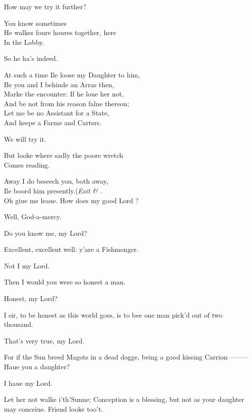 \documentclass[a5paper,DIV=calc,11pt]{scrbook}
\begin{document}
\begin{drama*}
    \kingspeaks How may we try it further?
    
    \polspeaks You know sometimes\\
    He walkes foure houres together, here\\
    In the Lobby.
    
    \queenspeaks So he ha's indeed.
    
    \polspeaks At such a time Ile loose my Daughter to him,\\
    Be you and I behinde an Arras then,\\
    Marke the encounter: If he loue her not,\\
    And be not from his reason falne thereon;\\
    Let me be no Assistant for a State,\\
    And keepe a Farme and Carters.
    
    \kingspeaks We will try it.
    
    
    \queenspeaks But looke where sadly the poore wretch\\
    Comes reading.
    
    \polspeaks Away I do beseech you, both away,\\
    Ile boord him presently.\hfill(\textit{Exit \king \& \queen.}\\
    Oh giue me leaue. How does my good Lord \ham?
    
    \hamspeaks Well, God-a-mercy.
    
    \polspeaks Do you know me, my Lord?
    
    \hamspeaks Excellent, excellent well: y'are a Fishmonger.
    
    \polspeaks Not I my Lord.
    
    \hamspeaks Then I would you were so honest a man.
    
    \polspeaks Honest, my Lord?
    
    \hamspeaks I sir, to be honest as this world goes, is to bee one man pick'd out of two thousand.
    
    \polspeaks That's very true, my Lord.
    
    \hamspeaks For if the Sun breed Magots in a dead dogge, being a good kissing Carrion———\\
    Haue you a daughter?
    
    \polspeaks I haue my Lord.
    
    \hamspeaks Let her not walke i'th'Sunne; Conception is a blessing, but not as your daughter may conceiue. Friend looke too't.
    

\end{drama*}
\end{document}
